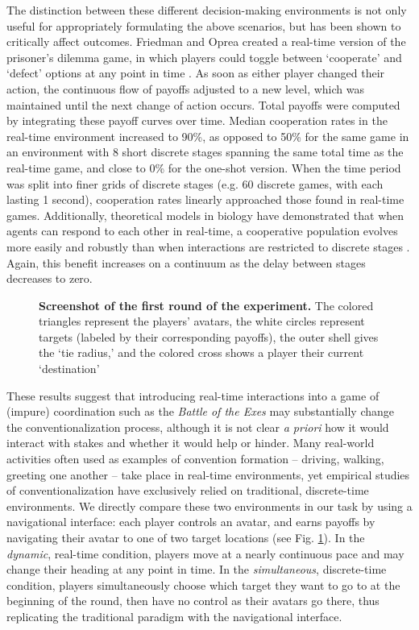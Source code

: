 \documentclass[10pt,letterpaper]{article}
\begin{document}
The distinction between these different decision-making environments is not only useful for appropriately formulating the above scenarios, but has been shown to critically affect outcomes. Friedman and Oprea created a real-time version of the prisoner's dilemma game, in which players could toggle between `cooperate' and `defect' options at any point in time \cite{FriedmanOprea12_ContinuousDilemma}. As soon as either player changed their action, the continuous flow of payoffs adjusted to a new level, which was maintained until the next change of action occurs. Total payoffs were computed by integrating these payoff curves over time. Median cooperation rates in the real-time environment increased to 90\%, as opposed to 50\% for the same game in an environment with 8 short discrete stages spanning the same total time as the real-time game, and close to 0\% for the one-shot version. When the time period was split into finer grids of discrete stages (e.g. 60 discrete games, with each lasting 1 second), cooperation rates linearly approached those found in real-time games. Additionally, theoretical models in biology have demonstrated that when agents can respond to each other in real-time, a cooperative population evolves more easily and robustly than when interactions are restricted to discrete stages \cite{vanDoornRiebliTaborsky14_CoactionReciprocityContinuousTime}. Again, this benefit increases on a continuum as the delay between stages decreases to zero. 

\begin{figure}
\centering
\caption{{\bf Screenshot of the first round of the experiment.} The colored triangles represent the players' avatars, the white circles represent targets (labeled by their corresponding payoffs), the outer shell gives the `tie radius,' and the colored cross shows a player their current `destination'}
\label{ex}
\end{figure}

These results suggest that introducing real-time interactions into a game of (impure) coordination such as the \emph{Battle of the Exes} may substantially change the conventionalization process, although it is not clear \emph{a priori} how it would interact with stakes and whether it would help or hinder. Many real-world activities often used as examples of convention formation -- driving, walking, greeting one another -- take place in real-time environments, yet empirical studies of conventionalization have exclusively relied on traditional, discrete-time environments. We directly compare these two environments in our task by using a navigational interface: each player controls an avatar, and earns payoffs by navigating their avatar to one of two target locations (see Fig. \ref{ex}). In the \emph{dynamic}, real-time condition, players move at a nearly continuous pace and may change their heading at any point in time. In the \emph{simultaneous}, discrete-time condition, players simultaneously choose which target they want to go to at the beginning of the round, then have no control as their avatars go there, thus replicating the traditional paradigm with the navigational interface.
\end{document}
